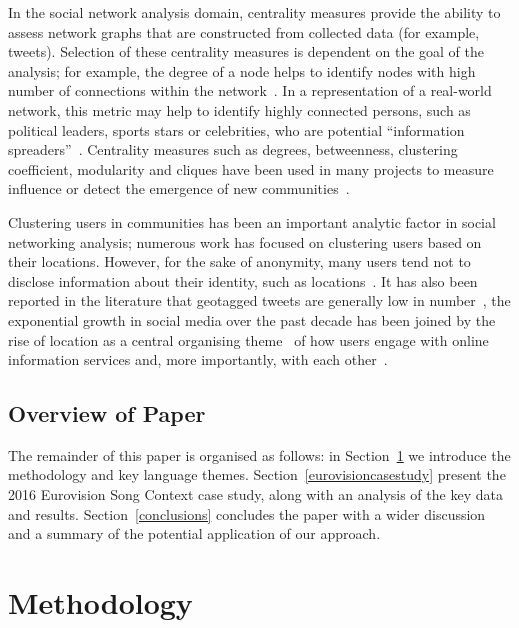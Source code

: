 \documentclass{llncs}
\begin{document}
In the social network analysis domain, centrality measures
provide the ability to assess network graphs that are constructed from
collected data (for example, tweets). Selection of these centrality
measures is dependent on the goal of the analysis; for example, the
degree of a node helps to identify nodes with high number of connections
within the
network~\cite{borgatti+everett:2000,rombach-et-al:2014,liu-et-al:2014}.
In a representation of a real-world network, this metric may help to
identify highly connected persons, such as political leaders, sports
stars or celebrities, who are potential ``information
spreaders''~\cite{cha-et-al:2012,borge-holthoefer-et-al:2012,zhang-et-al:2016}.
Centrality measures such as degrees, betweenness, clustering
coefficient, modularity and cliques have been used in many projects to
measure influence or detect the emergence of new
communities~\cite{willis-et-al:2015,oatley+crick:2015}.

Clustering users in communities has been an important analytic factor
in social networking analysis; numerous work has focused on clustering
users based on their locations. However, for the sake of anonymity,
many users tend not to disclose information about their identity, such
as locations~\cite{kang-et-al:2013}. It has also been reported in the
literature that geotagged tweets are generally low in
number~\cite{morstatter-et-al:2013,tan-et-al:2013,kumar-et-al:2014},
the exponential growth in social media over the past decade has been
joined by the rise of location as a central organising
theme~\cite{liang-et-al:2013} of how users engage with online
information services and, more importantly, with each
other~\cite{cheng-et-al:2010,caverlee-et-al:2013}.

\subsection{Overview of Paper}

The remainder of this paper is organised as follows: in
Section~\ref{method} we introduce the methodology and key language
themes.  Section~\ref{eurovisioncasestudy} present the 2016 Eurovision
Song Context case study, along with an analysis of the key data and
results. Section~\ref{conclusions} concludes the paper with a wider
discussion and a summary of the potential application of our approach.


\section{Methodology}\label{method}
\end{document}
